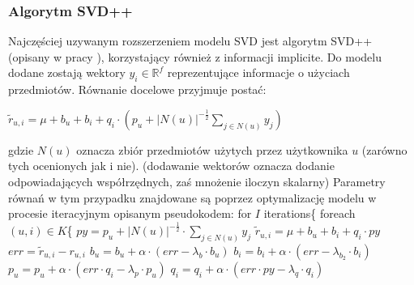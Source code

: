 \documentclass{pracamgr}
\begin{document}
    \subsubsection{Algorytm SVD++}
     Najczęściej uzywanym rozszerzeniem modelu SVD jest algorytm SVD++ (opisany w pracy \cite{SVD++}), korzystający również z informacji implicite.
     Do modelu dodane zostają wektory $y_i\in\mathbb{R}^f$ reprezentujące informacje o użyciach przedmiotów.
     Równanie docelowe przyjmuje postać:
     \begin{center}
      $\tilde{r}_{u,i}=\mu+b_u+b_i+q_i\cdot\left(p_u +|N(u)|^{-\frac{1}{2}}\sum\limits_{j\in N(u)}y_j\right)$
     \end{center}
     gdzie $N(u)$ oznacza zbiór przedmiotów użytych przez użytkownika $u$ (zarówno tych ocenionych jak i nie).\newline
     {\scriptsize
      (dodawanie wektorów oznacza dodanie odpowiadających współrzędnych, zaś mnożenie iloczyn skalarny)
     }\newline
     Parametry równań w tym przypadku znajdowane są poprzez optymalizację modelu w procesie iteracyjnym opisanym pseudokodem:\newline\newline
    \hspace*{16pt}	for $I$ iterations\{\newline
    \hspace*{32pt}		foreach $(u,i)\in K$\{\newline
    \hspace*{48pt}			$py=p_u +|N(u)|^{-\frac{1}{2}}\cdot\sum\limits_{j\in N(u)}y_j$\newline
    \hspace*{48pt}			$\tilde{r}_{u,i}=\mu+b_u+b_i+q_i\cdot py$\newline
    \hspace*{48pt}			$err=\tilde{r}_{u,i}-r_{u,i}$\newline
    \hspace*{48pt}			$b_u=b_u+\alpha\cdot(err-\lambda_b\cdot b_u)$\newline
    \hspace*{48pt}			$b_i=b_i+\alpha\cdot(err-\lambda_{b_2}\cdot b_i)$\newline
    \hspace*{48pt}			$p_u=p_u+\alpha\cdot(err\cdot q_i-\lambda_p\cdot p_u)$\newline
    \hspace*{48pt}			$q_i=q_i+\alpha\cdot(err\cdot py-\lambda_q\cdot q_i)$\newline
\end{document}
